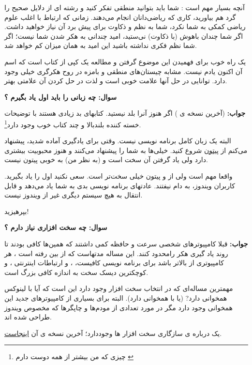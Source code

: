 آنچه بسیار مهم است : شما باید بتوانید منطقی تفکر کنید و رشته ای از دلایل صحیح را گرد هم بیاورید، کاری که ریاضی‌دانان انجام می‌دهند. زمانی که ارتباط با اغلب علوم ریاضی کمکی به شما نکرد، شما به نظم و ذکاوت برای پیش برد آن نیاز خواهید داشت. اگر شما چندان باهوش (با ذکاوت) نی‌ستید، امید چندانی به هکر شدن شما نیست؛ اگر شما نظم فکری نداشته باشید این امید به همان میزان کم خواهد شد.

یک راه خوب برای فهمیدن این موضوع گرفتن و مطالعه یک کپی از کتاب 
 است که اسم آن اکنون یادم نیست. مشابه چیستان‌های منطقی و بامزه 
 در روح هکرگری خیلی وجود دارد. توانایی در حل آنها علامت خوبی است و لذت در حل کردن آن علامتی بهتر.
 
\textbf{سوال:  چه زبانی را باید اول یاد بگیرم ؟}

\textbf{جواب:} 
 (آخرین نسخه ی 
) اگر هنوز آنرا بلد نیستید. کتابهای بد زیادی هستند با توضیحات خسته کننده بلندبالا و چند کتاب خوب وجود دارد\footnote{چیزی که من بیشتر از همه دوست دارم \href{http://www.oreilly.com/catalog/html5/}{}}.
 
البته 
 یک زبان کامل برنامه نویسی نیست. وقتی برای یادگیری آماده شدید، پیشنهاد می‌کنم از
\href{http://www.python.org/}{پیتون}
شروع کنید. خیلی‌ها به شما 
 را پیشنهاد می‌کنند و هنوز محبوبیت بیشتری دارد ولی یاد گرفتن آن سخت است و (به نظر من) به خوبی پیتون نیست.
 
 واقعا مهم است ولی از 
 و پیتون خیلی سخت‌تر است. سعی نکنید اول  را یاد بگیرید.
کاربران ویندوز، به دام  نیفتند. عادتهای برنامه نویسی بدی به شما یاد می‌دهد و قابل انتقال به هیچ سیستم دیگری غیر از ویندوز نیست. 

بپرهیزید!

\textbf{سوال:  چه سخت افزاری نیاز دارم ؟}

\textbf{جواب:} 
قبلا کامپیوترهای شخصی سرعت و حافظه کمی داشتند که همین‌ها کافی بودند تا روند یاد گیری هکر رامحدود کنند. این مساله مدتهاست که از بین رفته است ، هر کامپیوتری از 
 بالاتر باشد برای برنامه نویسی کافیست،  ، و ارتباطات اینترنتی ، و کوچکترین دیسک سخت به اندازه کافی بزرگ است.
 
مهمترین مساله‌ای که در انتخاب سخت افزار وجود دارد این است که آیا با لینوکس همخوانی دارد? (یا با 
همخوانی دارد). البته برای بسیاری از کامپیوترهای جدید این همخوانی وجود دارد مگر در مورد تعدادی از مودم‌ها و چاپگرها که مخصوص ویندوز طراحی شده اند.
 
یک 
 درباره ی سازگاری سخت افزار ها وجوددارد؛ آخرین نسخه ی آن
\href{http://en.tldp.org/HOWTO/Hardware-HOWTO/index.html}{اینجاست}.

